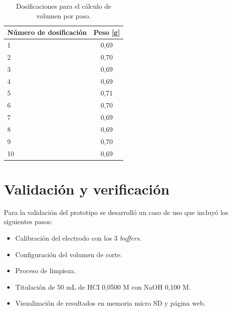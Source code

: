 \begin{table}[h]
	\centering
	\caption[Dosificaciones]{Dosificaciones para el cálculo de volumen por paso.}
	\begin{tabular}{l c }    
		\toprule
		\textbf{Número de dosificación} & \textbf{Peso [g] } \\
		\midrule
		1 	& 0,69 \\	
		2	& 0,70 \\
		3	& 0,69 \\
		4	& 0,69 \\
		5	& 0,71 \\
		6	& 0,70 \\
		7	& 0,69 \\
		8	& 0,69 \\
		9	& 0,70 \\
		10	& 0,69 \\
		\bottomrule
		\hline
	\end{tabular}
	\label{tab:ensayoBomba}
\end{table}

\section{Validación y verificación}
\label{sec:validacionVerificacion}

Para la validación del prototipo se desarrolló un caso de uso que incluyó los siguientes pasos:
\begin{itemize}
	\item Calibración del electrodo con los 3 \textit{buffers}.
	\item Configuración del volumen de corte.
	\item Proceso de limpieza.
	\item Titulación de 50 mL de HCI 0,0500 M con NaOH 0,100 M.
	\item Visualización de resultados en memoria micro SD y página web.
\end{itemize}




